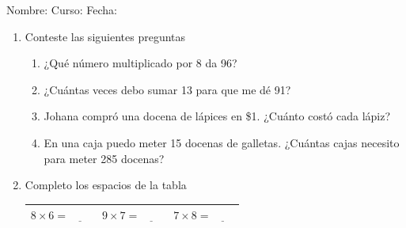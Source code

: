 \documentclass[letterpaper,fleqn]{article}
\newcommand{\LineaNombre}{%
\par
\vspace{\baselineskip}
Nombre:\hrulefill \; Curso: \underline{\hspace*{48pt}} \; Fecha: \underline{\hspace*{2.5cm}} \relax
\par}
\begin{document}
\LineaNombre
\begin{enumerate}
\item Conteste las siguientes preguntas
\begin{enumerate}
  \item ¿Qu\'e n\'umero multiplicado por 8 da 96? \underline{\hspace{2.5cm}}
  \item ¿Cu\'antas veces debo sumar 13 para que me d\'e 91?\underline{\hspace{2.5cm}}
  \item Johana compr\'o una docena de l\'apices en \$1. ¿Cuánto costó cada lápiz? \underline{\hspace{2.5cm}}
  \item En una caja puedo meter 15 docenas de galletas. ¿Cuántas cajas necesito para meter 285 docenas? \underline{\hspace{2.5cm}}
\end{enumerate}
\item Completo los espacios de la tabla
\begin{center}
\begin{tabular}{c|c|c}
$ 8\times6= \underline{\qquad}$ & $ 9\times7=\underline{\qquad} $ & $ 7\times8=\underline{\qquad} $\\[5pt]\hline

\end{tabular}
\end{center}
\end{enumerate}
\end{document}

